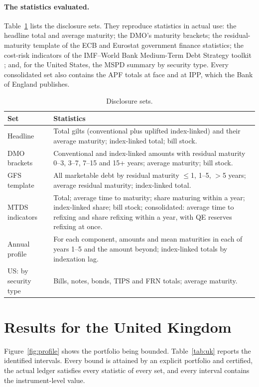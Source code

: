 \documentclass[11pt,a4paper]{article}
\theoremstyle{remark}
\begin{document}
\paragraph{The statistics evaluated.} Table~\ref{tab:sets} lists the disclosure sets. They reproduce statistics in actual use: the headline total and average maturity; the DMO's maturity brackets; the residual-maturity template of the ECB and Eurostat government finance statistics; the cost-risk indicators of the IMF--World Bank Medium-Term Debt Strategy toolkit \citep{IMFWB2014,IMFWB2019}; and, for the United States, the MSPD summary by security type. Every consolidated set also contains the APF totals at face and at IPP, which the Bank of England publishes.

\begin{table}[t]\centering\small
\caption{Disclosure sets.}\label{tab:sets}
\begin{tabular}{p{}p{}}
\toprule
Set & Statistics\\
\midrule
Headline & Total gilts (conventional plus uplifted index-linked) and their average maturity; index-linked total; bill stock.\\
DMO brackets & Conventional and index-linked amounts with residual maturity 0--3, 3--7, 7--15 and 15+ years; average maturity; bill stock.\\
GFS template & All marketable debt by residual maturity $\le$1, 1--5, $>$5 years; average residual maturity; index-linked total.\\
MTDS indicators & Total; average time to maturity; share maturing within a year; index-linked share; bill stock; consolidated: average time to refixing and share refixing within a year, with QE reserves refixing at once.\\
Annual profile & For each component, amounts and mean maturities in each of years 1--5 and the amount beyond; index-linked totals by indexation lag.\\
US: by security type & Bills, notes, bonds, TIPS and FRN totals; average maturity.\\
\bottomrule
\end{tabular}
\end{table}

\section{Results for the United Kingdom}\label{sec:uk}

Figure~\ref{fig:profile} shows the portfolio being bounded. Table~\ref{tab:uk} reports the identified intervals. Every bound is attained by an explicit portfolio and certified, the actual ledger satisfies every statistic of every set, and every interval contains the instrument-level value.
\end{document}
